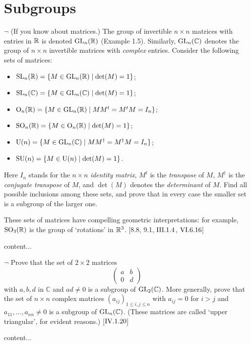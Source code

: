 \section{Subgroups}
\extitle
\begin{exercise}
	$\neg$ (If you know about matrices.) The group of invertible $n\times n$ matrices with entries in $\mathbb{R}$ is denoted $\operatorname{GL}_n(\mathbb{R})$ (Example 1.5). Similarly, $\operatorname{GL}_n(\mathbb{C})$ denotes the group of $n\times n$ invertible matrices with \emph{complex} entries. Consider the following sets of matrices:
	\begin{itemize}%
		\item $\operatorname{SL}_n(\mathbb{R}) = \{M\in \operatorname{GL}_n(\mathbb{R})\mid \det(M) = 1\}$;
		\item $\operatorname{SL}_n(\mathbb{C}) = \{M \in \operatorname{GL}_n(\mathbb{C}) \mid \det(M) = 1\}$;
		\item $\textnormal{O}_n(\mathbb{R}) = \{M \in \operatorname{GL}_n(\mathbb{R}) \mid MM^t = M^tM = I_n\}$;
		\item $\operatorname{SO}_n(\mathbb{R}) = \{M \in \textnormal{O}_n(\mathbb{R}) \mid \det(M) = 1\}$;
		\item $\operatorname{U}(n) = \{M \in \operatorname{GL}_n(\mathbb{C}) \mid MM^{\dagger} = M^\dagger M = I_n\}$;
		\item $\operatorname{SU}(n) = \{M \in \operatorname{U}(n) \mid \det(M) = 1\}$.
	\end{itemize}
	Here $I_n$ stands for the $n\times n$ \emph{identity matrix}, $M^t$ is the \emph{transpose} of $M$, $M^{\dagger}$ is the \emph{conjugate transpose} of $M$, and $\det(M)$ denotes the \emph{determinant} of $M$. Find all possible inclusions among these sets, and prove that in every case the smaller set is a subgroup of the larger one.
	
	These sets of matrices have compelling geometric interpretations: for example, $\operatorname{SO}_3(\mathbb{R})$ is the group of `rotations' in $\mathbb{R}^3$. [8.8, 9.1, $\RNo{3}.1.4$, $\RNo{6}.6.16$]
\end{exercise}
\begin{solution}
	content...
\end{solution}

\begin{exercise}
	$\neg$ Prove that the set of $2\times 2$ matrices 
	\[
		\begin{pmatrix}
			a & b \\
			0 & d
		\end{pmatrix}
	\]
	with $a,b,d$ in $\mathbb{C}$ and $ad \neq 0$ is a subgroup of $\operatorname{GL}_2(\mathbb{C})$. More generally, prove that the set of $n\times n$ complex matrices $(a_{ij})_{1\leq i,j\leq n}$ with $a_{ij} = 0$ for $i > j$ and $a_{11},\ldots, a_{nn}\neq 0$ is a subgroup of $\operatorname{GL}_n(\mathbb{C})$. (These matrices are called `upper triangular', for evident reasons.) [$\RNo{4}.1.20$]
\end{exercise}
\begin{solution}
	content...
\end{solution}

